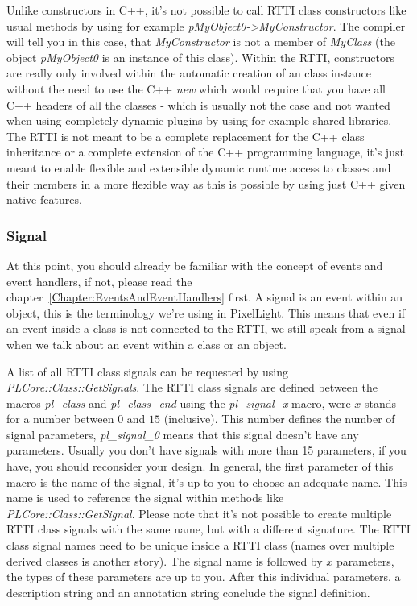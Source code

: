 Unlike constructors in C++, it's not possible to call \ac{RTTI} class constructors like usual methods by using for example \emph{pMyObject0->MyConstructor}. The compiler will tell you in this case, that \emph{MyConstructor} is not a member of \emph{MyClass} (the object \emph{pMyObject0} is an instance of this class). Within the \ac{RTTI}, constructors are really only involved within the automatic creation of an class instance without the need to use the C++ \emph{new} which would require that you have all C++ headers of all the classes - which is usually not the case and not wanted when using completely dynamic plugins by using for example shared libraries. The \ac{RTTI} is not meant to be a complete replacement for the C++ class inheritance or a complete extension of the C++ programming language, it's just meant to enable flexible and extensible dynamic runtime access to classes and their members in a more flexible way as this is possible by using just C++ given native features.



\subsubsection{Signal}
At this point, you should already be familiar with the concept of events and event handlers, if not, please read the chapter~\ref{Chapter:EventsAndEventHandlers} first. A signal is an event within an object, this is the terminology we're using in PixelLight. This means that even if an event inside a class is not connected to the \ac{RTTI}, we still speak from a signal when we talk about an event within a class or an object.

A list of all \ac{RTTI} class signals can be requested by using \emph{PLCore::Class::GetSignals}. The \ac{RTTI} class signals are defined between the macros \emph{pl\_class} and \emph{pl\_class\_end} using the \emph{pl\_signal\_x} macro, were $x$ stands for a number between $0$ and $15$ (inclusive). This number defines the number of signal parameters, \emph{pl\_signal\_0} means that this signal doesn't have any parameters. Usually you don't have signals with more than 15 parameters, if you have, you should reconsider your design. In general, the first parameter of this macro is the name of the signal, it's up to you to choose an adequate name. This name is used to reference the signal within methods like \emph{PLCore::Class::GetSignal}. Please note that it's not possible to create multiple \ac{RTTI} class signals with the same name, but with a different signature. The \ac{RTTI} class signal names need to be unique inside a \ac{RTTI} class (names over multiple derived classes is another story). The signal name is followed by $x$ parameters, the types of these parameters are up to you. After this individual parameters, a description string and an annotation string conclude the signal definition.

